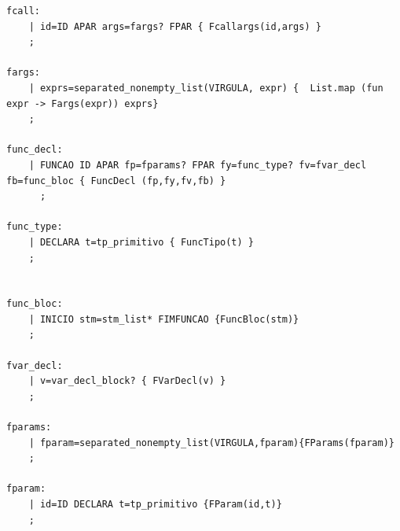 \documentclass[hidelinks,12pt]{article}
\begin{document}
\begin{lstlisting}[caption=parser.mly, style=OcamlStyle]
fcall:
    | id=ID APAR args=fargs? FPAR { Fcallargs(id,args) }
    ;

fargs:
    | exprs=separated_nonempty_list(VIRGULA, expr) {  List.map (fun expr -> Fargs(expr)) exprs}
    ;

func_decl:
    | FUNCAO ID APAR fp=fparams? FPAR fy=func_type? fv=fvar_decl fb=func_bloc { FuncDecl (fp,fy,fv,fb) }
	  ;

func_type:
    | DECLARA t=tp_primitivo { FuncTipo(t) }
    ;


func_bloc:
    | INICIO stm=stm_list* FIMFUNCAO {FuncBloc(stm)}
    ;
    
fvar_decl:
    | v=var_decl_block? { FVarDecl(v) }
    ;

fparams:
    | fparam=separated_nonempty_list(VIRGULA,fparam){FParams(fparam)}
    ;

fparam:
    | id=ID DECLARA t=tp_primitivo {FParam(id,t)}
    ;


	\end{lstlisting}
	
\end{document}
